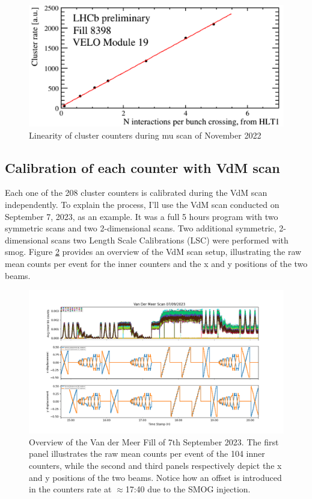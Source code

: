 \begin{figure}
    \centering
    \includegraphics[width=\textwidth]{figures/muscan.png}
    \caption{Linearity of cluster counters during mu scan of November 2022}
    \label{fig:muscan}
\end{figure}


\subsection{Calibration of each counter with VdM scan}\label{sec:calibration_vdm}
Each one of the 208 cluster counters is calibrated during the VdM scan independently. To explain the process, I'll use the VdM scan conducted on September 7, 2023, as an example.
It was a full 5 hours program with two symmetric scans and two 2-dimensional scans. Two additional symmetric, 2-dimensional scans two Length Scale Calibrations (LSC) were performed with smog. Figure \ref{fig:inner_vdm_sep} provides an overview of the VdM scan setup, illustrating the raw mean counts per event for the inner counters and the x and y positions of the two beams.



\begin{figure}
    \centering
    \includegraphics[width=\textwidth]{figures/inner_counts_bkg.png}
    \caption{Overview of the Van der Meer Fill of 7th September 2023. The first panel illustrates the raw mean counts per event of the 104 inner counters, while the second and third panels respectively depict the x and y positions of the two beams. Notice how an offset is introduced in the counters rate at $\approx$17:40 due to the SMOG injection.}
    \label{fig:inner_vdm_sep}
\end{figure}



